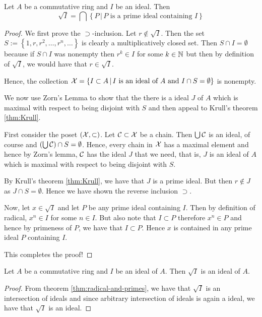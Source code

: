 \begin{theorem}
    Let $A$ be a commutative ring and $I$ be an ideal. Then 
    \begin{equation*}
	\sqrt{I} = \bigcap \left\{ P \, | \, P \text{ is a prime ideal containing } I \right\}
    \end{equation*}
    \label{thm:radical-and-primes}
\end{theorem}
\begin{proof}
    We first prove the $\supset$-inclusion. Let $r\not \in \sqrt{I}$. Then the set $S:=\left\{ 1, r, r^{2}, \ldots , r^{n}, \ldots \right\}$ is clearly a multiplicatively closed set. Then $S \cap I = \emptyset$ because if $S \cap I$ was nonempty then $r^k \in I$ for some $k \in \mathbb N$ but then by definition of $\sqrt{I}$, we would have that $r\in \sqrt{I}$.

    Hence, the collection ${\cal X} = \left\{ I \subset A \, | \, I \text{ is an ideal of } A \text{ and } I\cap S = \emptyset \right\}$ is nonempty.

    We now use Zorn's Lemma to show that the there is a ideal $J$ of $A$ which is maximal with respect to being disjoint with $S$ and then appeal to Krull's theorem \ref{thm:Krull}.

    First consider the poset $\left( {\cal X} , \subset \right)$. Let ${\cal C} \subset {\cal X}$ be a chain. Then $\bigcup {\cal C}$ is an ideal, of course and $\left(\bigcup {\cal C} \right) \cap S = \emptyset$. Hence, every chain in ${\cal X}$ has a maximal element and hence by Zorn's lemma, ${\cal C}$ has the ideal $J$ that we need, that is, $J$ is an ideal of $A$ which is maximal with respect to being disjoint with $S$.

    By Krull's theorem \ref{thm:Krull}, we have that $J$ is a prime ideal. But then $r\not \in J$ as $J \cap S =\emptyset$. Hence we have shown the reverse inclusion $\supset$.

    Now, let $x \in \sqrt{I}$ and let $P$ be any prime ideal containing $I$. Then by definition of radical, $x^{n } \in I$ for some $n \in I$. But also note that $I \subset P$ therefore $x^{n } \in P$ and hence by primeness of $P$, we have that $I \subset P$. Hence $x$ is contained in any prime ideal $P$ containing $I$. 

    This completes the proof!
\end{proof}

\begin{corollary}
    Let $A$ be a commutative ring and $I$ be an ideal of $A$. Then $\sqrt{I}$ is an ideal of $A$.
    \label{cor:radical-is-an-ideal}
\end{corollary}
\begin{proof}
    From theorem \ref{thm:radical-and-primes}, we have that $\sqrt{ I}$ is an intersection of ideals and since arbitrary intersection of ideals is again a ideal, we have that $\sqrt{I} $ is an ideal.
\end{proof}

